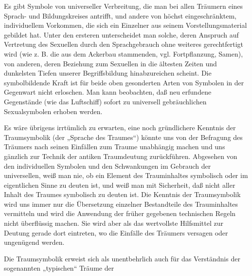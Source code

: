 \documentclass{article}
\begin{document}
         
            
            
            
        \pstart
        Es gibt Symbole von universeller Verbreitung, die man bei allen Träumern eines
               Sprach- und Bildungskreises antrifft, und andere von höchst eingeschränktem,
               individuellem Vorkommen, die sich ein Einzelner aus seinem Vorstellungsmaterial
               gebildet hat. Unter den ersteren unterscheidet man solche, deren Anspruch
               auf Vertretung des Sexuellen durch den Sprachgebrauch ohne weiteres
               gerechtfertigt wird (wie z. B. die aus dem Ackerbau stammenden, vgl.
               Fortpflanzung, Samen), von anderen, deren Beziehung zum Sexuellen in die
               ältesten Zeiten und dunkelsten Tiefen unserer Begriffsbildung hinabzureichen
               scheint. Die symbolbildende Kraft ist für beide oben gesonderten Arten von
               Symbolen in der Gegenwart nicht erloschen. Man kann beobachten, daß neu
               erfundene Gegenstände (wie das Luftschiff) sofort zu universell gebräuchlichen
               Sexualsymbolen erhoben werden.
        \pend
    
            
        \pstart
        Es wäre übrigens irrtümlich zu erwarten, eine noch gründlichere
               Kenntnis der Traumsymbolik (der „Sprache des Traumes“) könnte uns von der
               Befragung des Träumers nach seinen Einfällen zum Traume unabhängig
               machen und uns gänzlich zur Technik der antiken Traumdeutung zurückführen.
               Abgesehen von den individuellen Symbolen und den Schwankungen im Gebrauch
               der universellen, weiß man nie, ob ein Element des Trauminhaltes symbolisch oder
               im eigentlichen Sinne zu deuten ist, und weiß man mit Sicherheit, daß nicht
               aller Inhalt des Traumes symbolisch zu deuten ist. Die Kenntnis der Traumsymbolik wird uns immer nur die Übersetzung einzelner
               Bestandteile des Trauminhaltes vermitteln und wird die Anwendung der
               früher gegebenen technischen Regeln nicht überflüssig machen. Sie wird aber als
               das wertvollste Hilfsmittel zur Deutung gerade dort eintreten, wo die Einfälle
               des Träumers versagen oder ungenügend werden.
        \pend
    
            
        \pstart
        Die Traumsymbolik erweist sich als unentbehrlich auch für das Verständnis der
               sogenannten „typischen“ Träume der
        \pend
    
\end{document}
